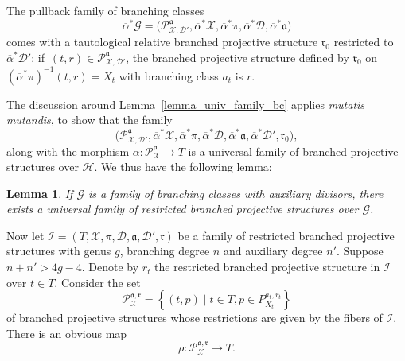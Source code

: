 \documentclass[JEP,XML,SOM,Unicode,NoEqCountersInSection,published]{cedram}
\theoremstyle{definition}
\theoremstyle{plain}
\newtheorem{lemma}[definition]{Lemma}
\begin{document}
The pullback family of branching classes\vspace*{-3pt}
\[
\overline \alpha^*\mathcal G = \bigl(\mathcal P_{\mathcal X, \mathcal D'}^{\mathfrak a}, \overline \alpha^*\mathcal X, \overline \alpha^* \pi, \overline \alpha^* \mathcal D, \overline \alpha^* \mathfrak a\bigr)
\]
comes with a tautological relative branched projective structure $\mathfrak r_0$ restricted to $\overline \alpha^* \mathcal D'$: if~$(t, r) \in \mathcal P_{\mathcal X, \mathcal D'}^{\mathfrak a}$, the branched projective structure defined by $\mathfrak r_0$ on $\left(\overline \alpha^*\pi\right)^{-1}(t, r) = X_t$ with branching class $a_t$ is $r$.

The discussion around Lemma~\ref{lemma_univ_family_bc} applies \emph{mutatis mutandis}, to show that the family\vspace*{-3pt}
\[
\bigl(\mathcal P_{\mathcal X, \mathcal D'}^{\mathfrak a}, \overline \alpha^*\mathcal X, \overline \alpha^* \pi, \overline \alpha^* \mathcal D, \overline \alpha^* \mathfrak a, \overline \alpha^* \mathcal D', \mathfrak r_0\bigr),
\]
along with the morphism $\overline \alpha: \mathcal P_{\mathcal X}^{\mathfrak a} \to T$ is a universal family of branched projective structures over $\mathcal H$.
We thus have the following lemma:

\begin{lemma}\label{lemma_universal_family_rbps_over_bc}
If $\mathcal G$ is a family of branching classes with auxiliary divisors, there exists a universal family of restricted branched projective structures over $\mathcal G$.
\end{lemma}

Now let $\mathcal I = (T, \mathcal X, \pi, \mathcal D, \mathfrak a, \mathcal D', \mathfrak r)$ be a family of restricted branched projective structures with genus $g$, branching degree $n$ and auxiliary degree $n'$.
Suppose $n+n' > 4g-4$.
Denote by $r_t$ the restricted branched projective structure in $\mathcal I$ over $t \in T$.
Consider the set\vspace*{-3pt}
\begin{equation*}
\mathcal P_{\mathcal X}^{\mathfrak a, \mathfrak r} = \left\{(t, p)\mid t \in T, p \in P_{X_t}^{a_t, r_t}\right\}
\end{equation*}
of branched projective structures whose restrictions are given by the fibers of $\mathcal I$.
There is an obvious map\vspace*{-3pt}
\begin{equation*}
\rho: \mathcal P_{\mathcal X}^{\mathfrak a, \mathfrak r} \to T.
\end{equation*}
\end{document}
